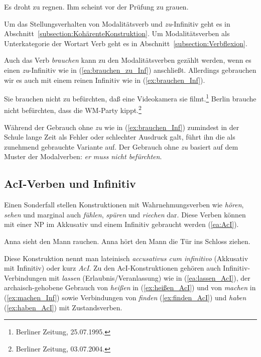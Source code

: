 \ea \label{ea:HalbMV_Subjekt}
\ea \label{ea:droht_zu_regnen} Es droht zu regnen.
\ex \label{ex:scheint_zu_grauen} Ihm scheint vor der Prüfung zu grauen.
\z 
\z 

Um das Stellungsverhalten von Modalitätsverb und \textit{zu}-Infinitiv geht es in Abschnitt~\ref{subsection:KohärenteKonstruktion}. Um Modalitätsverben als Unterkategorie der Wortart Verb geht es in Abschnitt~\ref{subsection:Verbflexion}.

Auch das Verb \textit{brauchen} kann zu den Modalitätsverben gezählt werden, wenn es einen \textit{zu}-Infinitiv wie in (\ref{ea:brauchen_zu_Inf}) anschließt. Allerdings gebrauchen wir es auch mit einem reinen Infinitiv wie in (\ref{ex:brauchen_Inf}).

\ea\label{ea:brauchen_(zu)_Inf}
\ea \label{ea:brauchen_zu_Inf} Sie brauchen nicht zu befürchten, daß eine Videokamera sie filmt.\footnote{Berliner Zeitung, 25.07.1995.}
\ex \label{ex:brauchen_Inf} Berlin brauche nicht befürchten, dass die WM-Party kippt.\footnote{Berliner Zeitung, 03.07.2004.}
\z 
\z 

Während der Gebrauch ohne \textit{zu} wie in (\ref{ex:brauchen_Inf}) zumindest in der Schule lange Zeit als Fehler oder schlechter Ausdruck galt, führt ihn die \citet[639, §1093]{Duden2022} als zunehmend gebrauchte Variante auf. Der Gebrauch ohne \textit{zu} basiert auf dem Muster der Modalverben: \textit{er muss nicht befürchten}. 



\subsection{AcI-Verben und Infinitiv}\label{subsection:AcI_Inf}
\largerpage

Einen Sonderfall stellen Konstruktionen mit Wahrnehmungsverben wie \textit{hören}, \textit{sehen} und marginal auch \textit{fühlen}, \textit{spüren} und \textit{riechen} dar. Diese Verben können mit einer NP im Akkusativ und einem Infinitiv gebraucht werden (\ref{ea:AcI}). 


\ea \label{ea:AcI} 
\ea \label{ea:hören_AcI} Anna sieht den Mann rauchen.
\ex \label{ex:sehen_AcI} Anna hört den Mann die Tür ins Schloss ziehen.
\z 
\z 

Diese Konstruktion nennt man lateinisch \textit{accusativus cum infinitivo} (Akkusativ mit Infinitiv) oder kurz \textit{AcI}. Zu den AcI-Konstruktionen gehören auch Infinitiv-Verbindungen mit \textit{lassen} (Erlaubnis/Veranlassung) wie in (\ref{ea:lassen_AcI}), der archaisch-gehobene Gebrauch von \textit{heißen} in (\ref{ex:heißen_AcI}) und von \textit{machen} in (\ref{ex:machen_Inf}) sowie Verbindungen von \textit{finden} (\ref{ex:finden_AcI}) und \textit{haben} (\ref{ex:haben_AcI}) mit Zustandsverben. 

